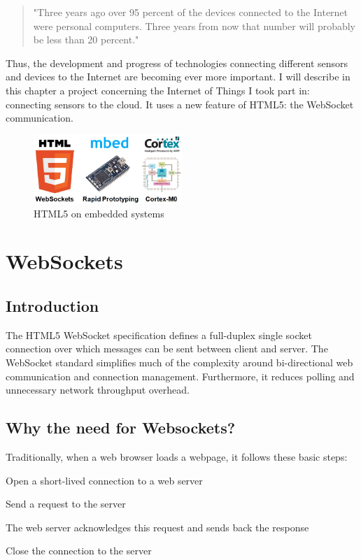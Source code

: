 \documentclass[pdftex,10pt,a4paper]{report}
\newenvironment{packed_item}{
\begin{itemize}
  \setlength{\itemsep}{1pt}
  \setlength{\parskip}{0pt}
  \setlength{\parsep}{0pt}
}{\end{itemize}}
\begin{document}
\begin{quote} "Three years ago over 95 percent of the devices connected to the Internet were personal computers. Three years from now that number will probably be less than 20 percent." \\
\end{quote}

Thus, the development and progress of technologies connecting different sensors and devices to the Internet are becoming ever more important. I will describe in this chapter a project concerning the Internet of Things I took part in: connecting sensors to the cloud. It uses a new feature of HTML5: the WebSocket communication.


\begin{figure}[h!]
		\centering
		\includegraphics[width=0.5\textwidth]{./logo_ws.jpg}
		\caption{HTML5 on embedded systems}
		\label{HTML5 on embedded systems}
\end{figure}

\section{WebSockets}
\subsection{Introduction}
The HTML5 WebSocket specification defines a full-duplex single socket connection over which messages can be sent between client and server. The WebSocket standard simplifies much of the complexity around bi-directional web communication and connection management. Furthermore, it reduces polling and unnecessary network throughput overhead.

\subsection{Why the need for Websockets?}
Traditionally, when a web browser loads a webpage, it follows these basic steps:

\begin{packed_item}
	\item Open a short-lived connection to a web server
	\item Send a request to the server
	\item The web server acknowledges this request and sends back the response
	\item Close the connection to the server
\end{packed_item}
\end{document}
